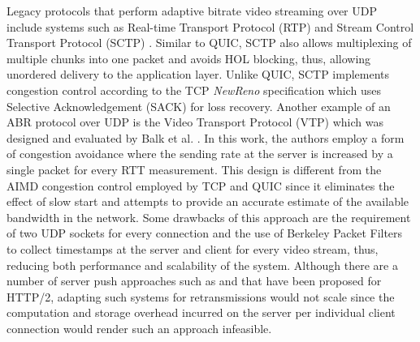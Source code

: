 Legacy protocols that perform adaptive bitrate video streaming over UDP include systems such as Real-time Transport Protocol (RTP) \cite{rtp} and Stream Control Transport Protocol (SCTP) \cite{sctp}. Similar to QUIC, SCTP also allows multiplexing of multiple chunks into one packet and avoids HOL blocking, thus, allowing unordered delivery to the application layer. Unlike QUIC, SCTP implements 
congestion control according to the TCP \textit{NewReno} specification which uses Selective Acknowledgement (SACK) for loss recovery.
Another example of an ABR protocol over UDP is the Video Transport Protocol (VTP) which was designed and evaluated by Balk et al. \cite{balk2003adaptive}. In this work, the authors employ a form of congestion avoidance where the sending rate at the server is increased by a single packet for every RTT measurement. This design is different from the AIMD congestion control employed by TCP and QUIC since it eliminates the effect of slow start and attempts to provide an accurate estimate of the available bandwidth in the network. Some drawbacks of this approach are the requirement of two UDP sockets for every connection and the use of Berkeley Packet Filters to collect timestamps at the server and client for every video stream, thus, reducing both performance and scalability of the system. Although there are a number of server push approaches such as \cite{huysegems2015http} and \cite{xiao2016evaluating} that have been proposed for HTTP/2, adapting such systems for retransmissions would not scale since the computation and storage overhead incurred on the server per individual client connection would render such an approach infeasible.
\begin{comment}
MORE RELATED WORK:

HotNets 2017~\cite{Narayan:HotNets:2017} \DB{This is only remotely related as it looks at software defined congestion control}

Sigcomm 2017 Carousel~\cite{Saeed:Sigcomm:2017} \DB{Remotely related as they look at timing wheels and rate control}
\end{comment}

